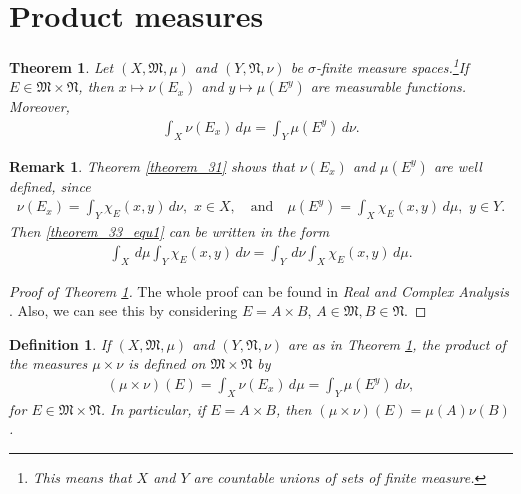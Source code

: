 \documentclass[11pt]{book}
\newtheorem{definition}{Definition}[chapter]
\newtheorem{theorem}{Theorem}[chapter]
\newtheorem{remark}{Remark}[chapter]
\theoremstyle{definition}
\numberwithin{equation}{chapter}
\begin{document}
\medskip

\section{Product measures}

\begin{theorem}\label{theorem_33}
Let $(X,\mathfrak{M},\mu)$ and $(Y,\mathfrak{N},\nu)$ be $\sigma$-finite measure spaces.\footnote{This means that $X$ and $Y$ are countable unions of sets of finite measure.}If $E \in \mathfrak{M} \times \mathfrak{N}$, then $x \mapsto \nu(E_x)$ and $y \mapsto \mu(E^y)$ are measurable functions. Moreover,
\begin{align}\label{theorem_33_equ1}
    \int_X \nu(E_x)\,d\mu = \int_Y \mu(E^y)\,d\nu.
\end{align}
\end{theorem}

\medskip

\begin{remark}
Theorem \ref{theorem_31} shows that $\nu(E_x)$ and $\mu(E^y)$ are well defined, since
\begin{align*}
    \nu(E_x) = \int_Y \chi_{E}(x,y) \,d\nu, \,\, x \in X, \quad \text{and} \quad \mu(E^y) = \int_X \chi_{E}(x,y) \,d\mu, \,\, y \in Y.
\end{align*}
Then \eqref{theorem_33_equ1} can be written in the form
\begin{align*}
    \int_X \,d\mu \int_Y \chi_{E}(x,y) \,d\nu = \int_Y \,d\nu \int_X \chi_{E}(x,y) \,d\mu.
\end{align*}
\end{remark}

\medskip

\begin{proof}[Proof of Theorem \ref{theorem_33}]
The whole proof can be found in {\em Real and Complex Analysis} \cite{2}. Also, we can see this by considering $E = A \times B$, $A \in \mathfrak{M}, B \in \mathfrak{N}$.
\end{proof}

\medskip

\begin{definition}
If $(X,\mathfrak{M},\mu)$ and $(Y,\mathfrak{N},\nu)$ are as in Theorem \ref{theorem_33}, the product of the measures $\mu \times \nu$ is defined on $\mathfrak{M} \times \mathfrak{N}$ by
\begin{align*}
    (\mu \times \nu)(E) = \int_X \nu(E_x)\,d\mu = \int_Y \mu(E^y)\,d\nu,
\end{align*}
for $E \in \mathfrak{M} \times \mathfrak{N}$. In particular, if $E = A \times B$, then $(\mu \times \nu)(E) = \mu(A) \nu(B)$.
\end{definition}
\end{document}
